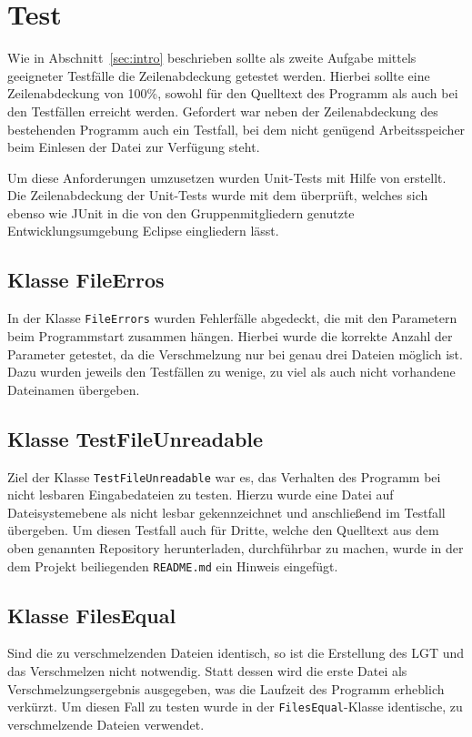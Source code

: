 \documentclass[a4paper,titlepage,12pt]{scrartcl}
\begin{document}
\section{Test}
\label{sec:test}

Wie in Abschnitt~\ref{sec:intro} beschrieben sollte als zweite Aufgabe mittels geeigneter Testfälle die Zeilenabdeckung getestet werden.
Hierbei sollte eine Zeilenabdeckung von 100\%, sowohl für den Quelltext des Programm als auch bei den Testfällen erreicht werden.
Gefordert war neben der Zeilenabdeckung des bestehenden Programm auch ein Testfall, bei dem nicht genügend Arbeitsspeicher beim Einlesen der Datei zur Verfügung steht.

Um diese Anforderungen umzusetzen wurden Unit-Tests mit Hilfe von \citep{www:JUNIT} erstellt. Die Zeilenabdeckung der Unit-Tests wurde mit dem \citep{www:ECLEMMA} überprüft, welches sich ebenso wie JUnit in die von den Gruppenmitgliedern genutzte Entwicklungsumgebung Eclipse eingliedern lässt.

\subsection{Klasse FileErros}
\label{sec:fileerrors}
In der Klasse \texttt{FileErrors} wurden Fehlerfälle abgedeckt, die mit den Parametern beim Programmstart zusammen hängen.
Hierbei wurde die korrekte Anzahl der Parameter getestet, da die Verschmelzung nur bei genau drei Dateien möglich ist.
Dazu wurden jeweils den Testfällen zu wenige, zu viel als auch nicht vorhandene Dateinamen übergeben.

\subsection{Klasse TestFileUnreadable}
\label{sec:fileunreadable}
Ziel der Klasse \texttt{TestFileUnreadable} war es, das Verhalten des Programm bei nicht lesbaren Eingabedateien zu testen.
Hierzu wurde eine Datei auf Dateisystemebene als nicht lesbar gekennzeichnet und anschließend im Testfall übergeben.
Um diesen Testfall auch für Dritte, welche den Quelltext aus dem oben genannten Repository herunterladen, durchführbar zu machen, wurde in der dem Projekt beiliegenden \texttt{README.md} ein Hinweis eingefügt.

\subsection{Klasse FilesEqual}
\label{sec:filesequal}
Sind die zu verschmelzenden Dateien identisch, so ist die Erstellung des LGT und das Verschmelzen nicht notwendig. Statt dessen wird die erste Datei als Verschmelzungsergebnis ausgegeben, was die Laufzeit des Programm erheblich verkürzt. Um diesen Fall zu testen wurde in der \texttt{FilesEqual}-Klasse identische, zu verschmelzende Dateien verwendet.
\end{document}
